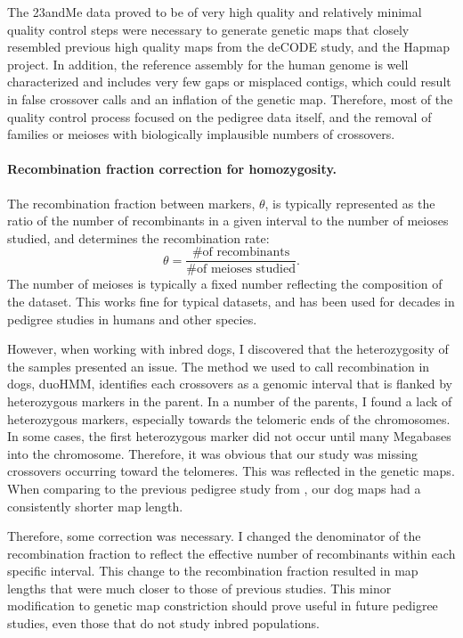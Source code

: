 The 23andMe data proved to be of very high quality and relatively minimal quality control steps were necessary to generate genetic maps that closely resembled previous high quality maps from the deCODE study\cite{Kong2010}, and the Hapmap project\cite{hapmap2007}.
In addition, the reference assembly for the human genome is well characterized and includes very few gaps or misplaced contigs, which could result in false crossover calls and an inflation of the genetic map.
Therefore, most of the quality control process focused on the pedigree data itself, and the removal of families or meioses with biologically implausible numbers of crossovers.

\paragraph{Recombination fraction correction for homozygosity.}
The recombination fraction between markers, $\theta$, is typically represented as the ratio of the number of recombinants in a given interval to the number of meioses studied, and determines the recombination rate:
\begin{equation*}
    \theta = \frac{ \text{\# of recombinants} } { \text{\# of meioses studied} } .
\end{equation*}
The number of meioses is typically a fixed number reflecting the composition of the dataset.
This works fine for typical datasets, and has been used for decades in pedigree studies in humans and other species.

However, when working with inbred dogs, I discovered that the heterozygosity of the samples presented an issue.
The method we used to call recombination in dogs, duoHMM, identifies each crossovers as a genomic interval that is flanked by heterozygous markers in the parent.
In a number of the parents, I found a lack of heterozygous markers, especially towards the telomeric ends of the chromosomes.
In some cases, the first heterozygous marker did not occur until many Megabases into the chromosome.
Therefore, it was obvious that our study was missing crossovers occurring toward the telomeres.
This was reflected in the genetic maps.
When comparing to the previous pedigree study from \citet{Wong2010}, our dog maps had a consistently shorter map length.

Therefore, some correction was necessary.
I changed the denominator of the recombination fraction to reflect the effective number of recombinants within each specific interval.
This change to the recombination fraction resulted in map lengths that were much closer to those of previous studies.
This minor modification to genetic map constriction should prove useful in future pedigree studies, even those that do not study inbred populations.


